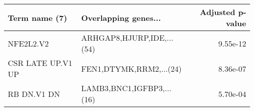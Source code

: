 \begin{tabular}{llr}
\toprule
    Term name (7) &      Overlapping genes... &  Adjusted p-value \\
\midrule
        NFE2L2.V2 & ARHGAP8,HJURP,IDE,...(54) &          9.55e-12 \\
CSR LATE UP.V1 UP &   FEN1,DTYMK,RRM2,...(24) &          8.36e-07 \\
      RB DN.V1 DN & LAMB3,BNC1,IGFBP3,...(16) &          5.70e-04 \\
\bottomrule
\end{tabular}
